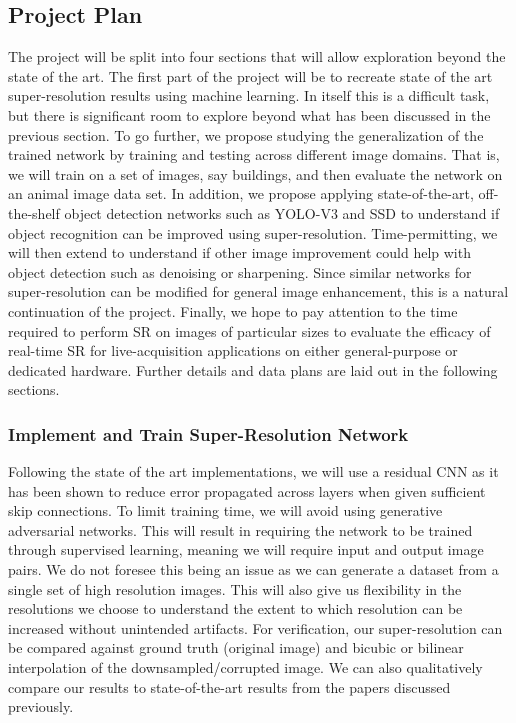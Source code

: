 \documentclass{article}
\begin{document}
\subsection{Project Plan}
The project will be split into four sections that will allow exploration beyond the state of the art. The first part of the project will be to recreate state of the art super-resolution results using machine learning. In itself this is a difficult task, but there is significant room to explore beyond what has been discussed in the previous section. To go further, we propose studying the generalization of the trained network by training and testing across different image domains. That is, we will train on a set of images, say buildings, and then evaluate the network on an animal image data set. In addition, we propose applying state-of-the-art, off-the-shelf object detection networks such as YOLO-V3 \cite{redmon2018yolov3} and SSD \cite{liu2016ssd} to understand if object recognition can be improved using super-resolution. Time-permitting, we will then extend to understand if other image improvement could help with object detection such as denoising or sharpening. Since similar networks for super-resolution can be modified for general image enhancement, this is a natural continuation of the project. Finally, we hope to pay attention to the time required to perform SR on images of particular sizes to evaluate the efficacy of real-time SR for live-acquisition applications on either general-purpose or dedicated hardware. Further details and data plans are laid out in the following sections.


\subsubsection{Implement and Train Super-Resolution Network}
Following the state of the art implementations, we will use a residual CNN as it has been shown to reduce error propagated across layers when given sufficient skip connections. To limit training time, we will avoid using generative adversarial networks. This will result in requiring the network to be trained through supervised learning, meaning we will require input and output image pairs. We do not foresee this being an issue as we can generate a dataset from a single set of high resolution images. This will also give us flexibility in the resolutions we choose to understand the extent to which resolution can be increased without unintended artifacts. For verification, our super-resolution can be compared against ground truth (original image) and bicubic or bilinear interpolation of the downsampled/corrupted image. We can also qualitatively compare our results to state-of-the-art results from the papers discussed previously.
\end{document}
